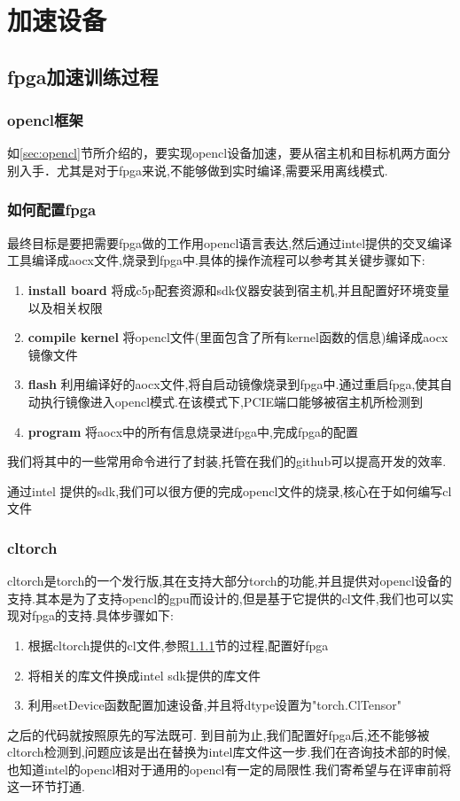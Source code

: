 \section{加速设备}
\subsection{fpga加速训练过程}
\subsubsection{opencl框架}\label{sec:opencl-step}
如\ref{sec:opencl}节所介绍的，要实现opencl设备加速，要从宿主机和目标机两方面分别入手．尤其是对于fpga来说,不能够做到实时编译,需要采用离线模式.
\subsubsection{如何配置fpga}
最终目标是要把需要fpga做的工作用opencl语言表达,然后通过intel提供的交叉编译工具编译成aocx文件,烧录到fpga中.具体的操作流程可以参考\cite{intel-opencl}其关键步骤如下:
\begin{enumerate}
  \item{\textbf{install board}} 将成c5p配套资源和sdk仪器安装到宿主机,并且配置好环境变量以及相关权限
  \item{\textbf{compile kernel}}  将opencl文件(里面包含了所有kernel函数的信息)编译成aocx镜像文件
  \item{\textbf{flash}} 利用编译好的aocx文件,将自启动镜像烧录到fpga中.通过重启fpga,使其自动执行镜像进入opencl模式.在该模式下,PCIE端口能够被宿主机所检测到
  \item{\textbf{program}} 将aocx中的所有信息烧录进fpga中,完成fpga的配置
\end{enumerate}

我们将其中的一些常用命令进行了封装,托管在我们的github\cite{myrcClub}可以提高开发的效率.

通过intel 提供的sdk,我们可以很方便的完成opencl文件的烧录,核心在于如何编写cl文件
\subsubsection{cltorch}
cltorch是torch的一个发行版,其在支持大部分torch的功能,并且提供对opencl设备的支持.其本是为了支持opencl的gpu而设计的,但是基于它提供的cl文件,我们也可以实现对fpga的支持.具体步骤如下:
\begin{enumerate}
  \item 根据cltorch提供的cl文件,参照\ref{sec:opencl-step}节的过程,配置好fpga
  \item 将相关的库文件换成intel sdk提供的库文件
  \item 利用setDevice函数配置加速设备,并且将dtype设置为"torch.ClTensor"
\end{enumerate}
之后的代码就按照原先的写法既可.
到目前为止,我们配置好fpga后,还不能够被cltorch检测到,问题应该是出在替换为intel库文件这一步.我们在咨询技术部的时候,也知道intel的opencl相对于通用的opencl有一定的局限性.我们寄希望与在评审前将这一环节打通.
